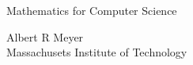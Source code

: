 \thispagestyle{empty}

\begin{center}
\begin{minipage}{4.5in}
\begin{center}
\rule{0in}{2in}
{\huge Mathematics for Computer Science}\\

\Stamp


\vspace{1in}
\iffalse
{\LARGE Eric Lehman}\\
{\large Google Inc.}

\vspace{0.3in}
{\LARGE F Thomson Leighton}\\
{\large Massachusets Institute of Technology}

\vspace{0.3in}
\fi

{\LARGE Albert R Meyer}\\
{\large Massachusets Institute of Technology}

\end{center}

\end{minipage}
\end{center}
\coursecopyright

\tableofcontents



\endinput
